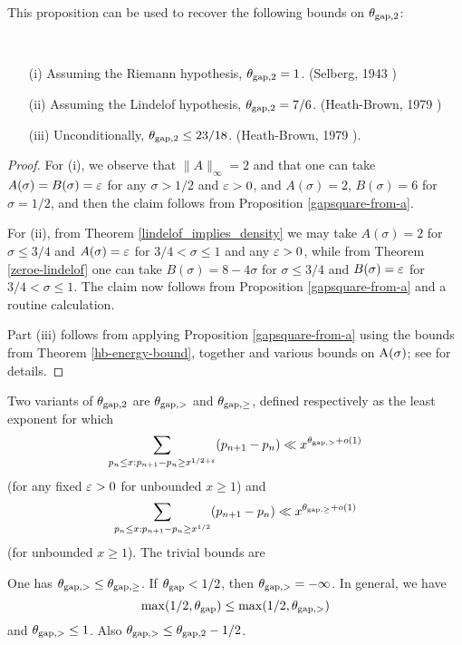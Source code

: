 This proposition can be used to recover the following bounds on $\theta_{\mathrm{gap},2}$:

\begin{corollary}\
    \begin{itemize}
    \item[(i)] Assuming the Riemann hypothesis, $\theta_{\mathrm{gap},2} = 1$. (Selberg, 1943 \cite{selberg_1943})
    \item[(ii)] Assuming the Lindelof hypothesis, $\theta_{\mathrm{gap},2} = 7/6$. (Heath-Brown, 1979 \cite{heath_brown_consecutive_II})
    \item[(iii)] Unconditionally, $\theta_{\mathrm{gap},2} \leq 23/18$. (Heath-Brown, 1979 \cite{heath_brown_consecutive_III}).
\end{itemize}
\end{corollary}

\begin{proof} For (i), we observe that $\|A\|_\infty=2$ and that one can take $A(\sigma)=B(\sigma)=\varepsilon$ for any $\sigma>1/2$ and $\varepsilon>0$, and $A(\sigma)=2$, $B(\sigma)=6$ for $\sigma=1/2$, and then the claim follows from Proposition \ref{gapsquare-from-a}.

For (ii), from Theorem \ref{lindelof_implies_density} we may take $A(\sigma)=2$ for $\sigma \leq 3/4$ and $A(\sigma)=\varepsilon$ for $3/4 < \sigma \leq 1$ and any $\varepsilon>0$, while from Theorem \ref{zeroe-lindelof} one can take $B(\sigma) = 8-4\sigma$ for $\sigma \leq 3/4$ and $B(\sigma)=\varepsilon$ for $3/4 < \sigma \leq 1$.  The claim now follows from Proposition \ref{gapsquare-from-a} and a routine calculation.

Part (iii) follows from applying Proposition \ref{gapsquare-from-a} using the bounds from Theorem \ref{hb-energy-bound}, together and various bounds on $\mathrm{A}(\sigma)$; see \cite[Theorem 12.14]{ivic} for details. 
\end{proof}

Two variants of $\theta_{\mathrm{gap},2}$ are $\theta_{\mathrm{gap},>}$ and $\theta_{\mathrm{gap},\geq}$, defined respectively as the least exponent for which
$$ \sum_{p_n \leq x: p_{n+1}-p_n \geq x^{1/2+\varepsilon}} (p_{n+1}-p_n) \ll x^{\theta_{\mathrm{gap},>}+o(1)}$$
(for any fixed $\varepsilon>0$ for unbounded $x \geq 1$) and
$$ \sum_{p_n \leq x: p_{n+1}-p_n \geq x^{1/2}} (p_{n+1}-p_n) \ll x^{\theta_{\mathrm{gap},\geq}+o(1)}$$
(for unbounded $x \geq 1$).  The trivial bounds are

\begin{proposition}\label{trivial-large-gap}  One has $\theta_{\mathrm{gap},>} \le \theta_{\mathrm{gap},\geq}$. If $\theta_{\mathrm{gap}} < 1/2$, then $\theta_{\mathrm{gap},>} = -\infty$.  In general, we have
    $$ \max(1/2,\theta_{\mathrm{gap}}) \leq \max(1/2, \theta_{\mathrm{gap},>})$$
    and $\theta_{\mathrm{gap},>} \leq 1$.  Also $\theta_{\mathrm{gap},>} \leq \theta_{\mathrm{gap},2} - 1/2$.
\end{proposition}

